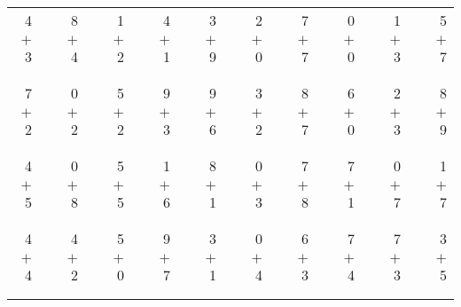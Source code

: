 \documentclass[12pt, letterpaper]{article}
\begin{document}
\begin{tabular}{rrrrrrrrrrrrrrrrrrr}
4 & & 8 & & 1 & & 4 & & 3 & & 2 & & 7 & & 0 & & 1 & & 5\\
$+$ 3 & & $+$ 4 & & $+$ 2 & & $+$ 1 & & $+$ 9 & & $+$ 0 & & $+$ 7 & & $+$ 0 & & $+$ 3 & & $+$ 7\\
\cline{1-1} \cline{3-3} \cline{5-5} \cline{7-7} \cline{9-9} \cline{11-11} \cline{13-13} \cline{15-15} \cline{17-17} \cline{19-19} \\ \\
7 & & 0 & & 5 & & 9 & & 9 & & 3 & & 8 & & 6 & & 2 & & 8\\
$+$ 2 & & $+$ 2 & & $+$ 2 & & $+$ 3 & & $+$ 6 & & $+$ 2 & & $+$ 7 & & $+$ 0 & & $+$ 3 & & $+$ 9\\
\cline{1-1} \cline{3-3} \cline{5-5} \cline{7-7} \cline{9-9} \cline{11-11} \cline{13-13} \cline{15-15} \cline{17-17} \cline{19-19} \\ \\
4 & & 0 & & 5 & & 1 & & 8 & & 0 & & 7 & & 7 & & 0 & & 1\\
$+$ 5 & & $+$ 8 & & $+$ 5 & & $+$ 6 & & $+$ 1 & & $+$ 3 & & $+$ 8 & & $+$ 1 & & $+$ 7 & & $+$ 7\\
\cline{1-1} \cline{3-3} \cline{5-5} \cline{7-7} \cline{9-9} \cline{11-11} \cline{13-13} \cline{15-15} \cline{17-17} \cline{19-19} \\ \\
4 & & 4 & & 5 & & 9 & & 3 & & 0 & & 6 & & 7 & & 7 & & 3\\
$+$ 4 & & $+$ 2 & & $+$ 0 & & $+$ 7 & & $+$ 1 & & $+$ 4 & & $+$ 3 & & $+$ 4 & & $+$ 3 & & $+$ 5\\
\cline{1-1} \cline{3-3} \cline{5-5} \cline{7-7} \cline{9-9} \cline{11-11} \cline{13-13} \cline{15-15} \cline{17-17} \cline{19-19} \\ \\
\end{tabular}
\newpage
\end{document}
